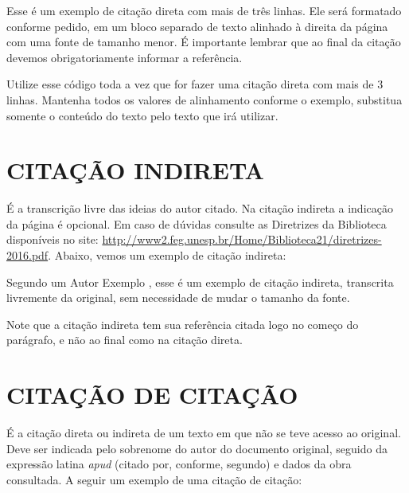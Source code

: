 \documentclass[
  12pt,		%
  a4paper,	%
  openright,%
  oneside,	%
  chapter=TITLE,		%
  section=TITLE,		%
  english,	%
  french,	%
  spanish,	%
  brazil	%
]{abntex2}
\begin{document}
            \vspace{1.5pt}
            \begin{flushright}
                \begin{minipage}{.724\textwidth}
                    {\SingleSpacing\small
                    Esse é um exemplo de citação direta com mais de três linhas. Ele será formatado conforme pedido, em um bloco separado de texto alinhado à direita da página com uma fonte de tamanho menor. É importante lembrar que ao final da citação devemos obrigatoriamente informar a referência. \cite[p.~3--4]{livro}
                    }
                \end{minipage}
            \end{flushright}
            \vspace{1.5pt}
             
             Utilize esse código toda a vez que for fazer uma citação direta com mais de 3 linhas. Mantenha todos os valores de alinhamento conforme o exemplo, substitua somente o conteúdo do texto pelo texto que irá utilizar.
             
        \section{CITAÇÃO INDIRETA}
        
            É a transcrição livre das ideias do autor citado. Na citação indireta a indicação da página é opcional. Em caso de dúvidas consulte as Diretrizes da Biblioteca disponíveis no site: \url{http://www2.feg.unesp.br/Home/Biblioteca21/diretrizes-2016.pdf}. Abaixo, vemos um exemplo de citação indireta:
            
            Segundo um Autor Exemplo \cite{livro}, esse é um exemplo de citação indireta, transcrita livremente da original, sem necessidade de mudar o tamanho da fonte.
            
            Note que a citação indireta tem sua referência citada logo no começo do parágrafo, e não ao final como na citação direta.
            
        \section{CITAÇÃO DE CITAÇÃO}
            
            É a citação direta ou indireta de um texto em que não se teve acesso ao original. Deve ser indicada pelo sobrenome do autor do documento original, seguido da expressão latina \textit{apud} (citado por, conforme, segundo) e dados da obra consultada. A seguir um exemplo de uma citação de citação:
            
\end{document}

